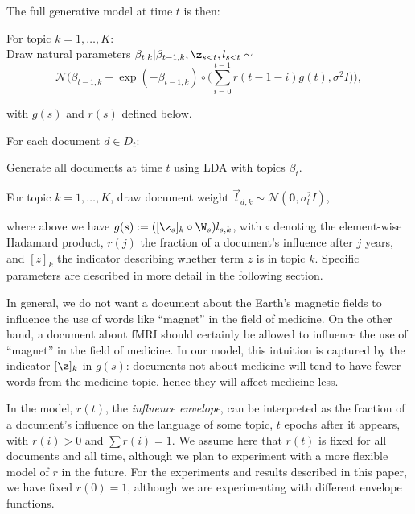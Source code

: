 The full generative model at time $t$ is then:
\begin{packed_enum}
  \item For topic $k = 1, \ldots, K$: \label{gen:beta} \\
     Draw natural parameters \small $\beta_{t,k} | \beta_{t-1,k}, \z_{s<t}, l_{s<t} \sim$ \\
     \[
      \mathcal{N} \Bigg(\beta_{t-1,k}
      + \exp(-\beta_{t-1,k}) \circ \big( \sum_{i=0}^{t-1} r(t-1-i) g(t), \sigma^2 I \big) \Bigg),
      \]
\normalsize

      with $g(s)$ and $r(s)$ defined below.
  \item For each document $d \in D_t$:
      \begin{packed_enum}
	\item Generate all documents at time $t$ using LDA with topics
	  $\beta_{t}$.
	\item For topic $k = 1, \ldots, K$,  \label{gen:l}
	  draw document weight $\vec{l}_{d,k} \sim \mathcal{N}(\textbf{0}, \sigma_l^2 I)$,
      \end{packed_enum}

\end{packed_enum}
where above we have $g(s) := ([\z_{s}]_k \circ
 \W_{s}) l_{s,k}$,
with $\circ$ denoting the element-wise
 Hadamard product, $r(j)$ the
fraction of a document's influence after $j$ years, and $[z]_k$ the
indicator describing whether term $z$ is in
 topic $k$.  Specific
parameters are described in more detail in the following section.

In general, we do not want a document about the Earth's magnetic
fields to influence the use of words like ``magnet'' in the field of
medicine.  On the other hand, a document about fMRI should certainly
be allowed to influence the use of ``magnet'' in the field of
medicine.  In our model, this intuition is captured by the indicator
$[\z]_k$ in $g(s)$: documents not about medicine will tend to have
fewer words from the medicine topic, hence they will affect medicine
less.

In the model, $r(t)$, the \emph{influence envelope}, can be
interpreted as the fraction of a document's influence on the language
of some topic, $t$ epochs after it appears, with $r(i) > 0$ and $\sum r(i)
= 1$.  We assume here that $r(t)$ is fixed for all documents and all
time, although we plan to experiment with a more flexible model of $r$
in the future.  For the experiments and results described in this
paper, we have fixed $r(0) = 1$, although we are experimenting with
different envelope functions.

